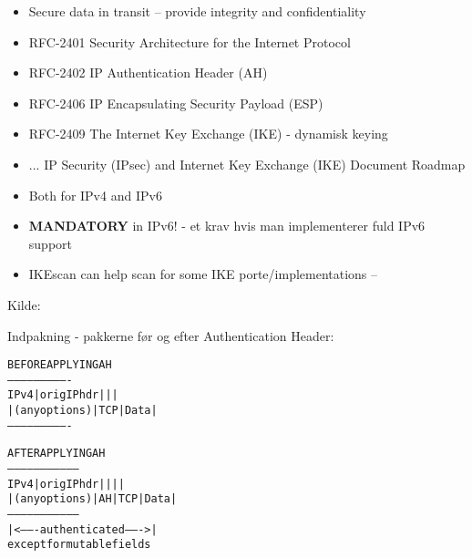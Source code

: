 \documentclass[Screen16to9,17pt]{foils}
\begin{document}

\begin{itemize}
\item Secure data in transit -- provide integrity and confidentiality
\item RFC-2401 Security Architecture for the Internet Protocol
\item RFC-2402 IP Authentication Header (AH)
\item RFC-2406 IP Encapsulating Security Payload (ESP)
\item RFC-2409 The Internet Key Exchange (IKE) - dynamisk keying
\item ... IP Security (IPsec) and Internet Key Exchange (IKE) Document Roadmap\\
\item Both for IPv4 and IPv6
\item {\bfseries MANDATORY} in IPv6! - et krav hvis man implementerer
  fuld IPv6 support
\item IKEscan can help scan for some IKE
  porte/implementations -- \\
\end{itemize}




\centerline{Kilde: }



Indpakning - pakkerne før og efter Authentication Header:
\begin{alltt}
\small
                BEFORE APPLYING AH
            ----------------------------
      IPv4  |orig IP hdr  |     |      |
            |(any options)| TCP | Data |
            ----------------------------

                  AFTER APPLYING AH
            ---------------------------------
      IPv4  |orig IP hdr  |    |     |      |
            |(any options)| AH | TCP | Data |
            ---------------------------------
            |<------- authenticated ------->|
                 except for mutable fields
\end{alltt}
\end{document}

